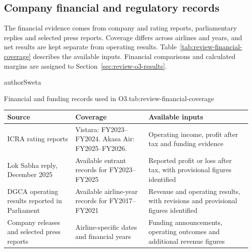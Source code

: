 \subsection{Company financial and regulatory records}
The financial evidence comes from company and rating reports, parliamentary replies and selected press reports. Coverage differs across airlines and years, and net results are kept separate from operating results. Table~\ref{tab:review-financial-coverage} describes the available inputs. Financial comparisons and calculated margins are assigned to Section~\ref{sec:review-o3-results}.
\begin{mergedcontribution}{authorSweta}
\begin{resultstable}{Financial and funding records used in O3.}{tab:review-financial-coverage}
\color{authorSweta}
\begin{tabular}{|>{\raggedright\arraybackslash}p{}|>{\raggedright\arraybackslash}p{}|>{\raggedright\arraybackslash}p{}|}
\hline
\textbf{Source} & \textbf{Coverage} & \textbf{Available inputs} \\
\hline
ICRA rating reports & Vistara: FY2023--FY2024. Akasa Air: FY2025--FY2026. & Operating income, profit after tax and funding evidence \\
\hline
Lok Sabha reply, December 2025 & Available entrant records for FY2023--FY2025 & Reported profit or loss after tax, with provisional figures identified \\
\hline
DGCA operating results reported in Parliament & Available airline-year records for FY2017--FY2021 & Revenue and operating results, with revisions and provisional figures identified \\
\hline
Company releases and selected press reports & Airline-specific dates and financial years & Funding announcements, operating outcomes and additional revenue figures \\
\hline
\end{tabular}
\par{}
\end{resultstable}
\end{mergedcontribution}
